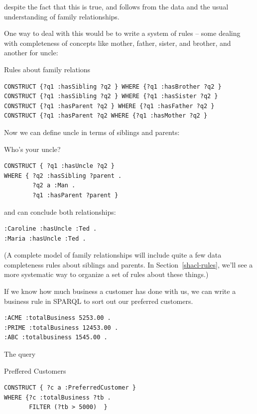 despite the fact that this is true, and follows from the data and the usual understanding of family relationships.


One way to deal with this would be to write a system of rules -- some
dealing with completeness of concepts like mother, father, sister, and
brother, and another for uncle:

\begin{query}Rules about family relations\end{query}
\begin{lstlisting}
CONSTRUCT {?q1 :hasSibling ?q2 } WHERE {?q1 :hasBrother ?q2 }
CONSTRUCT {?q1 :hasSibling ?q2 } WHERE {?q1 :hasSister ?q2 }
CONSTRUCT {?q1 :hasParent ?q2 } WHERE {?q1 :hasFather ?q2 }
CONSTRUCT {?q1 :hasParent ?q2 WHERE {?q1 :hasMother ?q2 }
\end{lstlisting}

Now we can define uncle in terms of siblings and parents:

\begin{query}Who's your uncle?\end{query}
\begin{lstlisting}
CONSTRUCT { ?q1 :hasUncle ?q2 }
WHERE { ?q2 :hasSibling ?parent .
        ?q2 a :Man .
        ?q1 :hasParent ?parent }
\end{lstlisting}


and can conclude both relationships:

\begin{lstlisting}
:Caroline :hasUncle :Ted .
:Maria :hasUncle :Ted .
\end{lstlisting}

(A complete model of family relationships will include quite a few data
completeness rules about siblings and parents. In Section~\ref{shacl-rules}, we'll see a
more systematic way to organize a set of rules about these things.)

If we know how much business a customer has done with us, we can write a
business rule in 
SPARQL to sort out our preferred customers.

\begin{lstlisting}
:ACME :totalBusiness 5253.00 .
:PRIME :totalBusiness 12453.00 .
:ABC :totalbusiness 1545.00 .
\end{lstlisting}

The query

\begin{query}Preffered Customers\end{query}
\begin{lstlisting}
CONSTRUCT { ?c a :PreferredCustomer }
WHERE {?c :totalBusiness ?tb .
       FILTER (?tb > 5000)  }
\end{lstlisting}

